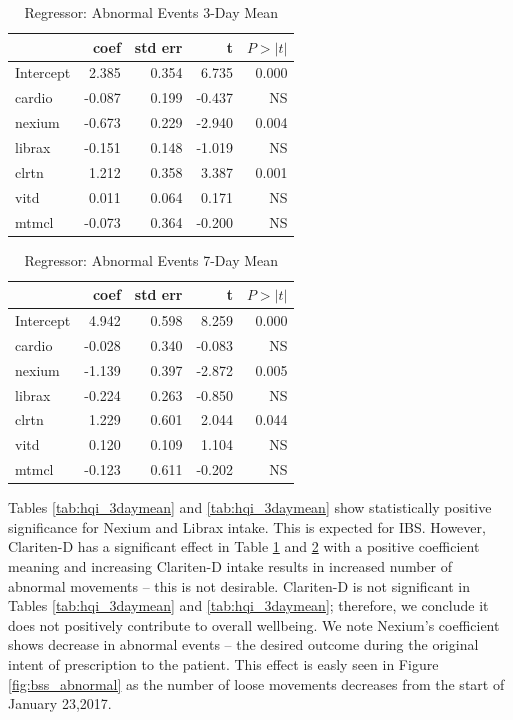\documentclass[conference]{IEEEtran}
\begin{document}
\begin{table}
\begin{center}
    \caption{Regressor: Abnormal Events 3-Day Mean} \label{tab:abnormal_3daymean}
    \begin{tabular}{ | l | r | r | r | r |}
    \hline
     & coef & std err & t & $P>\left|t\right|$ \\ \hline
Intercept & 2.385 & 0.354 & 6.735 & 0.000 \\
cardio & -0.087 & 0.199 & -0.437 & NS \\
nexium & -0.673 & 0.229 & -2.940 & 0.004 \\
librax & -0.151 & 0.148 & -1.019 & NS \\
clrtn & 1.212 & 0.358 & 3.387 & 0.001 \\
vitd & 0.011 & 0.064 & 0.171 & NS \\
mtmcl & -0.073 & 0.364 & -0.200 & NS \\
    \hline
    \end{tabular}
\end{center}
\end{table}

\begin{table}
\begin{center}
\caption{Regressor: Abnormal Events 7-Day Mean} \label{tab:abnormal_7daymean}
    \begin{tabular}{ | l | r | r | r | r |}
    \hline
     & coef & std err & t & $P>\left|t\right|$ \\ \hline
Intercept & 4.942 & 0.598 & 8.259 & 0.000 \\
cardio & -0.028 & 0.340 & -0.083 & NS \\
nexium & -1.139 & 0.397 & -2.872 & 0.005 \\
librax & -0.224 & 0.263 & -0.850 & NS \\
clrtn & 1.229 & 0.601 & 2.044 & 0.044 \\
vitd & 0.120 & 0.109 & 1.104 & NS \\
mtmcl & -0.123 & 0.611 & -0.202 & NS \\
    \hline
    \end{tabular}
\end{center}
\end{table}

Tables \ref{tab:hqi_3daymean} and \ref{tab:hqi_3daymean} show statistically positive significance for Nexium and Librax intake.  This is expected for IBS.  However, Clariten-D has a significant effect in Table \ref{tab:abnormal_3daymean} and \ref{tab:abnormal_7daymean} with a positive coefficient  meaning and increasing Clariten-D intake results in increased number of abnormal movements -- this is not desirable. Clariten-D is not significant in Tables \ref{tab:hqi_3daymean} and \ref{tab:hqi_3daymean}; therefore, we conclude it does not positively contribute to overall wellbeing.  We note Nexium's coefficient shows decrease in abnormal events -- the desired outcome during the original intent of prescription to the patient.  This effect is easly seen in Figure \ref{fig:bss_abnormal} as the number of loose movements decreases from the start of January 23,2017.
\end{document}
